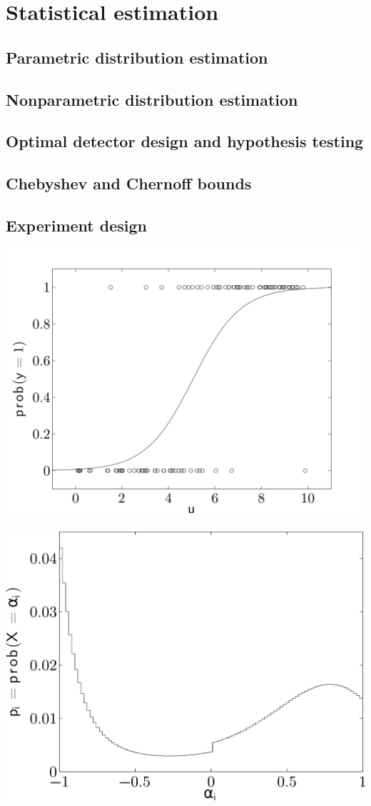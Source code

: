 \chapter{Statistical estimation}

\clearpage
\section{Parametric distribution estimation}

\clearpage
\section{Nonparametric distribution estimation}

\clearpage
\section{Optimal detector design and hypothesis testing}

\clearpage
\section{Chebyshev and Chernoff bounds}

\clearpage
\section{Experiment design}


\clearpage
\hfil\includegraphics[width=.5\textwidth]{../Graphics/355.png}\hfil

\clearpage
\hfil\includegraphics[width=.5\textwidth]{../Graphics/363.png}\hfil

